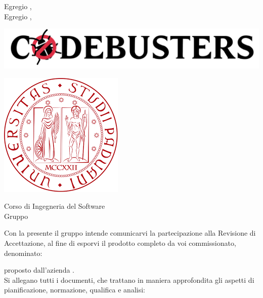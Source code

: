 \documentclass[11pt]{letter}
\begin{document}
    \begin{letter}
        { Egregio \VT{},\\Egregio \CR{},}
        \begin{minipage}{.4\textwidth}
            \begin{flushleft}
                \includegraphics[width=1.5\textwidth]{Utility/Images/logo2.png}
            \end{flushleft}
        \end{minipage}
        \begin{minipage}{.5\textwidth}
            \begin{flushright}
                \includegraphics[width=.4\linewidth]{Utility/Images/logoUnipd.png}
            \end{flushright}
        \end{minipage}
        {    
        \begin{flushleft}
            Corso di Ingegneria del Software\\ Gruppo \Gruppo{}\\ 
        \end{flushleft}
        }
        \opening{ Con la presente il gruppo \Gruppo{} intende comunicarvi la partecipazione alla Revisione di Accettazione, al fine di esporvi il prodotto completo da voi commissionato, denominato:}
        \begin{center}
           \textbf{\NomeProgetto{}} 
        \end{center}
        proposto dall'azienda \textbf{\Proponente{}}.\\
        Si allegano tutti i documenti, che trattano in maniera approfondita gli aspetti di pianificazione, normazione, qualifica e analisi:
        \begin{itemize}

\end{itemize}
\end{letter}
\end{document}

